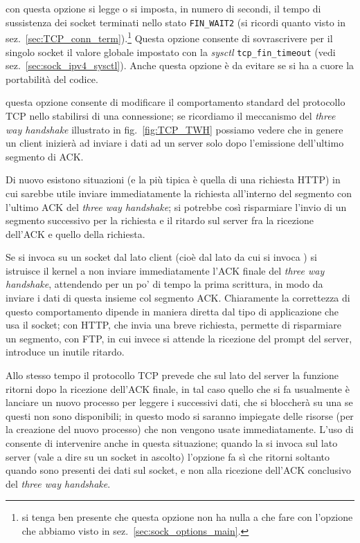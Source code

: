 \begin{basedescript}{\desclabelwidth{1.5cm}\desclabelstyle{\nextlinelabel}}
\item[\constd{TCP\_LINGER2}] con questa opzione si legge o si imposta, in
  numero di secondi, il tempo di sussistenza dei socket terminati nello stato
  \texttt{FIN\_WAIT2} (si ricordi quanto visto in
  sez.~\ref{sec:TCP_conn_term}).\footnote{si tenga ben presente che questa
    opzione non ha nulla a che fare con l'opzione  che
    abbiamo visto in sez.~\ref{sec:sock_options_main}.}  Questa opzione
  consente di sovrascrivere per il singolo socket il valore globale impostato
  con la \textit{sysctl} \texttt{tcp\_fin\_timeout} (vedi
  sez.~\ref{sec:sock_ipv4_sysctl}).  Anche questa opzione è da evitare se si
  ha a cuore la portabilità del codice.

\item[\constd{TCP\_DEFER\_ACCEPT}] questa opzione consente di modificare il
  comportamento standard del protocollo TCP nello stabilirsi di una
  connessione; se ricordiamo il meccanismo del \textit{three way handshake}
  illustrato in fig.~\ref{fig:TCP_TWH} possiamo vedere che in genere un client
  inizierà ad inviare i dati ad un server solo dopo l'emissione dell'ultimo
  segmento di ACK.

  Di nuovo esistono situazioni (e la più tipica è quella di una richiesta
  HTTP) in cui sarebbe utile inviare immediatamente la richiesta all'interno
  del segmento con l'ultimo ACK del \textit{three way handshake}; si potrebbe
  così risparmiare l'invio di un segmento successivo per la richiesta e il
  ritardo sul server fra la ricezione dell'ACK e quello della richiesta.

  Se si invoca  su un socket dal lato client (cioè
  dal lato da cui si invoca ) si istruisce il kernel a non
  inviare immediatamente l'ACK finale del \textit{three way handshake},
  attendendo per un po' di tempo la prima scrittura, in modo da inviare i dati
  di questa insieme col segmento ACK.  Chiaramente la correttezza di questo
  comportamento dipende in maniera diretta dal tipo di applicazione che usa il
  socket; con HTTP, che invia una breve richiesta, permette di risparmiare un
  segmento, con FTP, in cui invece si attende la ricezione del prompt del
  server, introduce un inutile ritardo.

  Allo stesso tempo il protocollo TCP prevede che sul lato del server la
  funzione  ritorni dopo la ricezione dell'ACK finale, in tal
  caso quello che si fa usualmente è lanciare un nuovo processo per leggere i
  successivi dati, che si bloccherà su una  se questi non sono
  disponibili; in questo modo si saranno impiegate delle risorse (per la
  creazione del nuovo processo) che non vengono usate immediatamente.  L'uso
  di  consente di intervenire anche in questa
  situazione; quando la si invoca sul lato server (vale a dire su un socket in
  ascolto) l'opzione fa sì che  ritorni soltanto quando sono
  presenti dei dati sul socket, e non alla ricezione dell'ACK conclusivo del
  \textit{three way handshake}.


\end{basedescript}
